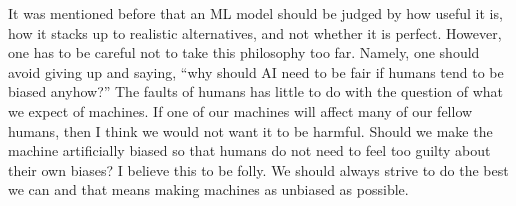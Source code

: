 It was mentioned before that an \ac{ML} model should be judged by how useful it is, how it stacks
up to realistic alternatives, and not whether it is perfect. However, one has to be careful not to
take this philosophy too far. Namely, one should avoid giving up and saying, ``why should AI need
to be fair if humans tend to be biased anyhow?'' The faults of humans has little to do with the
question of what we expect of machines.
If one of our machines will affect many of our fellow humans, then I think we would not want it to
be harmful. Should we make the machine artificially biased so that humans do not need to feel too
guilty about their own biases? I believe this to be folly. We should always strive to do the best
we can and that means making machines as unbiased as possible.

